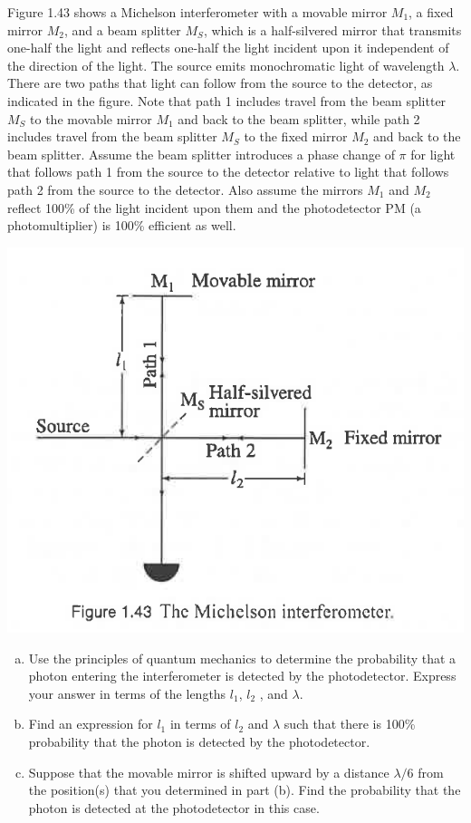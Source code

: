 \documentclass[12pt,letterpaper]{hmcpset}
\begin{document}
	\begin{problem}[T1.27:]
		Figure 1.43 shows a Michelson interferometer with a movable mirror $M_1$, a fixed mirror $M_2$, and a beam splitter $M_S$, which is a half-silvered mirror that transmits one-half the light and reflects one-half the light incident upon it independent of the direction of the light.
		The source emits monochromatic light of wavelength $\lambda$.
		There are two paths that light can follow from the source to the detector, as indicated in the figure.
		Note that path 1 includes travel from the beam splitter $M_S$ to the movable mirror $M_1$ and back to the beam splitter, while path 2 includes travel from the beam splitter $M_S$ to the fixed mirror $M_2$ and back to the beam splitter.
		Assume the beam splitter introduces a phase change of $\pi$ for light that follows path 1 from the source to the detector relative to light that follows path 2 from the source to the detector.
		Also assume the mirrors $M_1$ and $M_2$ reflect 100\% of the light incident upon them and the photodetector PM (a photomultiplier) is 100\% efficient as well.

		\centering\includegraphics[scale = 0.5]{Fig_1-43}

		\begin{enumerate}[(a)]
			\item Use the principles of quantum mechanics to determine the probability that a photon entering the interferometer is detected by the photodetector. Express your answer in terms of the lengths $l_1$, $l_2$ , and $\lambda$.
			\item Find an expression for $l_1$ in terms of $l_2$ and $\lambda$ such that there is 100\% probability that the photon is detected by the photodetector.
			\item Suppose that the movable mirror is shifted upward by a distance $\lambda/6$ from the position(s) that you determined in part (b). Find the probability that the photon is detected at the photodetector in this case.
		\end{enumerate}
	\end{problem}
	\clearpage
\end{document}
